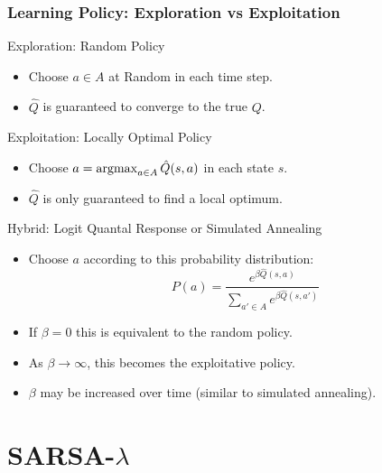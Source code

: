 \documentclass[ignorenonframetext]{beamer}
\newcommand{\argmax}{\operatornamewithlimits{argmax}}
\begin{document}
\begin{frame}[allowframebreaks]
	\frametitle{Learning Policy: Exploration vs Exploitation}
	\begin{block}{Exploration: Random Policy}
		\begin{itemize}
			\item Choose $a \in A$ at Random in each time step.
			\item $\hat{Q}$ is guaranteed to converge to the true $Q$.
		\end{itemize}
	\end{block}
	\begin{block}{Exploitation: Locally Optimal Policy}
		\begin{itemize}
			\item Choose $a = \argmax_{a\in A} \hat{Q}(s,a)$ in each state
				$s$.
			\item $\hat{Q}$ is only guaranteed to find a local optimum.
		\end{itemize}
	\end{block}
	\begin{block}{Hybrid: Logit Quantal Response or Simulated Annealing}
		\begin{itemize}
			\item Choose $a$ according to this probability distribution:
				\[
				P(a) = \frac{e^{\beta\hat{Q}(s,a)}}{\sum_{a'\in
				A}e^{\beta\hat{Q}(s,a')}}
				\]
			\item If $\beta = 0$ this is equivalent to the random policy.
			\item As $\beta \to \infty$, this becomes the exploitative
				policy.
			\item $\beta$ may be increased over time (similar to simulated
				annealing).
		\end{itemize}
	\end{block}
\end{frame}

\section{SARSA-$\lambda$}
\end{document}
